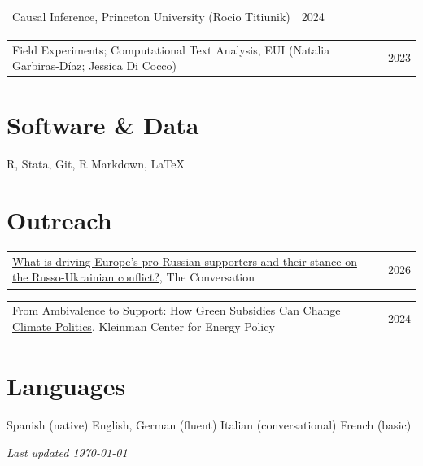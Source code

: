 \documentclass[11pt,letterpaper]{article}
\makeatletter
\newcommand{\simpleitem}[2]{%
  \begin{tabularx}{\linewidth}{@{}X r@{}}
    #1 & {\color{muted}#2}\\
  \end{tabularx}\vspace{0.1em}
}
\makeatother
\begin{document}
\simpleitem{Causal Inference, Princeton University (Rocio Titiunik)}{2024}
\simpleitem{Field Experiments; Computational Text Analysis, EUI (Natalia Garbiras-D\'iaz; Jessica Di Cocco)}{2023}


\section{Software \& Data}

R, Stata, Git, R Markdown, \LaTeX


\section{Outreach}

\simpleitem{\href{https://theconversation.com/what-is-driving-europes-pro-russian-supporters-and-their-stance-on-the-russo-ukrainian-conflict-281598}{What is driving Europe's pro‑Russian supporters and their stance on the Russo‑Ukrainian conflict?}, The Conversation}{2026}
\simpleitem{\href{https://kleinmanenergy.upenn.edu/commentary/blog/insights-from-the-the-political-economy-of-climate-change-and-the-environment-2024-mini-conference/}{From Ambivalence to Support: How Green Subsidies Can Change Climate Politics}, Kleinman Center for Energy Policy}{2024}


\section{Languages}

Spanish (native) \quad\textbullet\quad English, German (fluent) \quad\textbullet\quad Italian (conversational) \quad\textbullet\quad French (basic)

\vfill
\begin{flushright}
{\color{muted}\textit{Last updated \today}}
\end{flushright}
\end{document}

